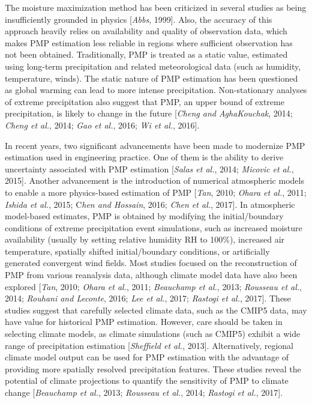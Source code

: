 The moisture maximization method has been criticized in several studies as being insufficiently grounded in physics [\textit{Abbs}, 1999]. Also, the accuracy of this approach heavily relies on availability and quality of observation data, which makes PMP estimation less reliable in regions where sufficient observation has not been obtained. Traditionally, PMP is treated as a static value, estimated using long-term precipitation and related meteorological data (such as humidity, temperature, winds). The static nature of PMP estimation has been questioned as global warming can lead to more intense precipitation. Non-stationary analyses of extreme precipitation also suggest that PMP, an upper bound of extreme precipitation, is likely to change in the future [\textit{Cheng and AghaKouchak}, 2014; \textit{Cheng et al.}, 2014; \textit{Gao et al.}, 2016; \textit{Wi et al.}, 2016].

In recent years, two significant advancements have been made to modernize PMP estimation used in engineering practice. One of them is the ability to derive uncertainty associated with PMP estimation [\textit{Salas et al.}, 2014; \textit{Micovic et al.}, 2015]. Another advancement is the introduction of numerical atmospheric models to enable a more physics-based estimation of PMP [\textit{Tan}, 2010; \textit{Ohara et al.}, 2011; \textit{Ishida et al.}, 2015; C\textit{hen and Hossain}, 2016; \textit{Chen et al.}, 2017]. In atmospheric model-based estimates, PMP is obtained by modifying the initial/boundary conditions of extreme precipitation event simulations, such as increased moisture availability (usually by setting relative humidity RH to 100\%), increased air temperature, spatially shifted initial/boundary conditions, or artificially generated convergent wind fields. Most studies focused on the reconstruction of PMP from various reanalysis data, although climate model data have also been explored [\textit{Tan}, 2010; \textit{Ohara et al.}, 2011; \textit{Beauchamp et al.}, 2013; \textit{Rousseau et al.}, 2014; \textit{Rouhani and Leconte}, 2016; \textit{Lee et al.}, 2017; \textit{Rastogi et al.}, 2017]. These studies suggest that carefully selected climate data, such as the CMIP5 data, may have value for historical PMP estimation. However, care should be taken in selecting climate models, as climate simulations (such as CMIP5) exhibit a wide range of precipitation estimation [\textit{Sheffield et al.}, 2013]. Alternatively, regional climate model output can be used for PMP estimation with the advantage of providing more spatially resolved precipitation features. These studies reveal the potential of climate projections to quantify the sensitivity of PMP to climate change [\textit{Beauchamp et al.}, 2013; \textit{Rousseau et al.}, 2014; \textit{Rastogi et al.}, 2017].

